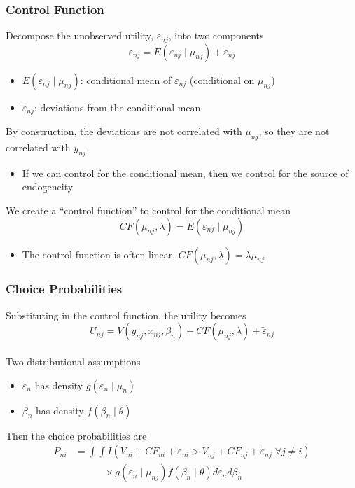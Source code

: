 \documentclass{beamer}
\begin{document}
\begin{frame}\frametitle{Control Function}
    Decompose the unobserved utility, $\varepsilon_{nj}$, into two components
    $$\varepsilon_{nj} = E(\varepsilon_{nj} \mid \mu_{nj}) + \tilde{\varepsilon}_{nj}$$
    \vspace{-3ex}
    \begin{itemize}
        \item $E(\varepsilon_{nj} \mid \mu_{nj})$: conditional mean of $\varepsilon_{nj}$ (conditional on $\mu_{nj}$)
        \item $\tilde{\varepsilon}_{nj}$: deviations from the conditional mean
    \end{itemize}
    \vspace{2ex}
    By construction, the deviations are not correlated with $\mu_{nj}$, so they are not correlated with $y_{nj}$
    \begin{itemize}
        \item If we can control for the conditional mean, then we control for the source of endogeneity
    \end{itemize}
    \vspace{2ex}
    We create a ``control function'' to control for the conditional mean
    $$CF(\mu_{nj}, \lambda) = E(\varepsilon_{nj} \mid \mu_{nj})$$
    \vspace{-3ex}
    \begin{itemize}
        \item The control function is often linear, $CF(\mu_{nj}, \lambda) = \lambda \mu_{nj}$
    \end{itemize}
\end{frame}

\begin{frame}\frametitle{Choice Probabilities}
    Substituting in the control function, the utility becomes
    $$U_{nj} = V(y_{nj}, x_{nj}, \beta_n) + CF(\mu_{nj}, \lambda) + \tilde{\varepsilon}_{nj}$$ \\
    \vspace{2ex}
    Two distributional assumptions 
    \begin{itemize}
        \item $\tilde{\varepsilon}_n$ has density $g(\tilde{\varepsilon}_n \mid \mu_n)$
        \item $\beta_n$ has density $f(\beta_n \mid \theta)$
    \end{itemize}
    \vspace{2ex}
    Then the choice probabilities are
    \begin{align*}
        P_{ni} &= \int \int I(V_{ni} + CF_{ni} + \tilde{\varepsilon}_{ni} > V_{nj} + CF_{nj} + \tilde{\varepsilon}_{nj} \; \forall j \neq i) \\
        & \qquad \quad \times g(\tilde{\varepsilon}_n \mid \mu_{nj}) f(\beta_n \mid \theta) d \tilde{\varepsilon}_n d \beta_n
    \end{align*}
\end{frame}
\end{document}
